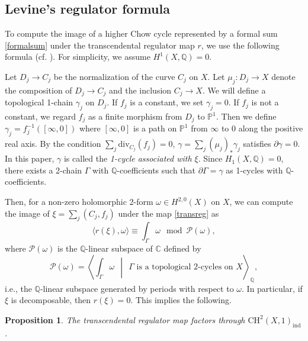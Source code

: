 \documentclass[letterpaper, 11pt]{amsart}
\theoremstyle{my theoremstyle}
\newtheorem{prop}[thm]{Proposition}
\theoremstyle{dfn}
\theoremstyle{remark}
\renewcommand{\1}{\mathbbm{1}}
\newcommand{\C}{\mathbb{C}}
\newcommand{\Q}{\mathbb{Q}}
\renewcommand{\P}{\mathbb{P}}
\numberwithin{equation}{section}
\begin{document}
\subsection{Levine's regulator formula}
To compute the image of a higher Chow cycle represented by a formal sum \eqref{formalsum} under the transcendental regulator map $r$, we use the following formula (cf. \cite{Levine}).
For simplicity, we assume $H^1(X,\Q)=0$.

Let $D_j\to C_j$ be the normalization of the curve $C_j$ on $X$. 
Let $\mu_j\colon D_j\to X$ denote the composition of $D_j\to C_j$ and the inclusion $C_j\to X$. 
We will define a topological 1-chain $\gamma_j$ on $D_j$.
If $f_j$ is a constant, we set $\gamma_j = 0$.
If $f_j$ is not a constant, we regard $f_j$ as a finite morphism from $D_j$ to $\P^1$. 
Then we define $\gamma_j = f_j^{-1}([\infty, 0])$ where $[\infty, 0]$ is a path on $\P^1$ from $\infty$ to $0$ along the positive real axis. 
By the condition $\sum_j \mathrm{div}_{C_j}(f_j) = 0$, $\gamma = \sum_j (\mu_j)_*\gamma_j$ satisfies $\partial \gamma=0$.
In this paper, $\gamma$ is called the \textit{1-cycle associated with $\xi$}.
Since $H_1(X, \Q) = 0$, there exists a 2-chain $\Gamma$ with $\Q$-coefficients such that $\partial\Gamma = \gamma$ as 1-cycles with $\Q$-coefficients.

Then, for a non-zero holomorphic 2-form $\omega\in H^{2,0}(X)$ on $X$, we can compute the image of $\xi =\sum_j(C_j,f_j)$ under the map \eqref{transreg} as 
\begin{equation}\label{transregval}
\langle r(\xi), \omega\rangle  \equiv \int_{\Gamma}\omega \mod \mathcal{P}(\omega), 
\end{equation}
where $\mathcal{P}(\omega)$ is the $\Q$-linear subspace of $\C$ defined by
\begin{equation}\label{Pdef}
\mathcal{P}(\omega) = \left\langle \displaystyle \int_{\Gamma}\omega  \:\: \middle| \:\:\Gamma \text{ is a topological 2-cycles on }X\right\rangle_\Q, 
\end{equation}
i.e., the $\Q$-linear subspace generated by periods with respect to $\omega$.
In particular, if $\xi$ is decomposable, then $r(\xi) = 0$. 
This implies the following.

\begin{prop}\label{transregprop}
The transcendental regulator map factors through $\mathrm{CH}^2(X,1)_{\mathrm{ind}}$.
\end{prop}
\end{document}
